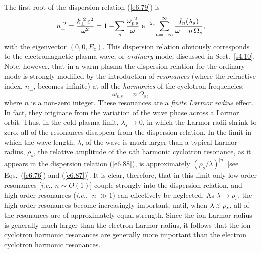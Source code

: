 The first root of the dispersion relation (\ref{e6.79}) is
\begin{equation}\label{e6.88}
n_\perp^{~2}=\frac{k_\perp^{~2}\,c^2}{\omega^2} = 1 - \!
\sum_s \frac{\omega_{p\,s}^{~2}}{\omega}\,\,
{\rm e}^{-\lambda_s} \!\sum_{n=-\infty}^\infty
\frac{I_n(\lambda_s)}{\omega-n\,{\Omega}_s},
\end{equation}
with the eigenvector $(0,0,E_z)$. This dispersion relation obviously
corresponds to the electromagnetic plasma wave, or {\em ordinary}\/ mode, discussed 
in Sect.~\ref{s4.10}.
Note, however, that in a warm plasma the dispersion relation for the ordinary mode
is strongly modified by the introduction of {\em resonances}\/ (where the refractive
 index, $n_\perp$,
becomes infinite) at all the {\em harmonics}\/ of the cyclotron frequencies:
\begin{equation}
\omega_{n\,s} = n\,{\Omega}_s,
\end{equation}
where $n$ is a non-zero integer. These resonances are a {\em finite Larmor radius}\/ 
effect. In fact, they originate from the variation of the wave phase 
across a Larmor orbit. Thus, in the cold plasma limit, $\lambda_s\rightarrow 0$,
in which the Larmor radii shrink to zero, all of the resonances disappear from
the dispersion relation. In the limit in which the wave-length, $\lambda$, of
the wave is much larger than a typical Larmor radius, $\rho_s$, the
relative amplitude of the $n$th harmonic cyclotron resonance, as it
appears in the dispersion
relation (\ref{e6.88}), is approximately 
$(\rho_s/\lambda)^{|n|}$ [see Eqs.~(\ref{e6.76}) and (\ref{e6.87})]. It is clear, therefore, that
in this limit only low-order resonances [{\em i.e.}, $n\sim O(1)$] couple
strongly into the dispersion relation, and high-order resonances
({\em i.e.}, $|n| \gg 1$) can effectively be neglected. As $\lambda\rightarrow
\rho_s$, the high-order resonances become increasingly important, until,
when $\lambda\stackrel {_{\normalsize<}}{_{\normalsize \sim}} \rho_s$, all of the resonances are of approximately equal
strength. Since the ion Larmor radius is generally much larger than the
electron Larmor radius, it follows that the ion cyclotron harmonic resonances
are generally more important than the electron cyclotron harmonic resonances.


